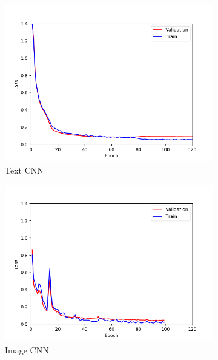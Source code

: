 \documentclass{article} %
\begin{document}
\begin{figure}
    \centering
    \begin{subfigure}[b]{0.3\textwidth}
        \centering
        \includegraphics[width=\textwidth]{html_val_train.png}
        \caption{Text CNN}
        \label{fig:blockpage}
    \end{subfigure}
    \hfill
        \hfill
    \begin{subfigure}[b]{0.3\textwidth}
        \centering
        \includegraphics[width=\textwidth]{png_val_train.png}
        \caption{Image CNN}
        \label{fig:connectionerror}
    \end{subfigure}
   \hfill
    \begin{subfigure}[b]{0.3\textwidth}

\end{subfigure}
\end{figure}
\end{document}
